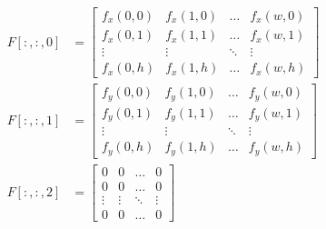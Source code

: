 \begin{equation}\label{eq:FragPosMatrix}
	\begin{aligned}
		F[:,:,0] &= 
		\begin{bmatrix} 
			f_x(0,0)    & f_x(1,0)  & \dots     & f_x(w,0)  \\
			f_x(0,1)    & f_x(1,1)  & \dots     & f_x(w,1)  \\
			\vdots      & \vdots    & \ddots    & \vdots    \\
			f_x(0,h)    & f_x(1,h)  & \dots     & f_x(w,h)  
		\end{bmatrix} \\
		F[:,:,1] &= 
		\begin{bmatrix} 
			f_y(0,0)    & f_y(1,0)  & \dots     & f_y(w,0)  \\
			f_y(0,1)    & f_y(1,1)  & \dots     & f_y(w,1)  \\
			\vdots      & \vdots    & \ddots    & \vdots    \\
			f_y(0,h)    & f_y(1,h)  & \dots     & f_y(w,h)  
		\end{bmatrix} \\
		F[:,:,2] &= 
		\begin{bmatrix} 
			0    & 0  & \dots     & 0  \\
			0    & 0  & \dots     & 0  \\
			\vdots      & \vdots    & \ddots    & \vdots    \\
			0    & 0  & \dots     & 0  
		\end{bmatrix}
	\end{aligned}
\end{equation}




    

